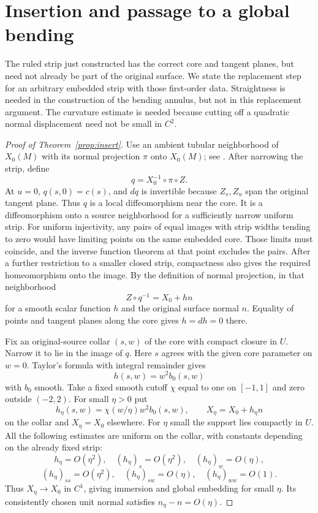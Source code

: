 \documentclass[11pt]{amsart}
\theoremstyle{definition}
\begin{document}
\section{Insertion and passage to a global bending}
\label{sec:insertion}

The ruled strip just constructed has the correct core and tangent
planes, but need not already be part of the original surface.
We state the replacement step for an arbitrary embedded strip
with those first-order data. Straightness is needed in the
construction of the bending annulus, but not in this replacement
argument. The curvature estimate is needed because cutting off
a quadratic normal displacement need not be small in $C^2$.

\begin{proof}[Proof of Theorem~\ref{prop:insert}]
Use an ambient tubular neighborhood of $X_0(M)$ with its normal
projection $\pi$ onto $X_0(M)$; see
\cite[Theorem~6.24]{Lee}. After narrowing the strip, define
\[
 q=X_0^{-1}\circ\pi\circ Z .
\]
At $u=0$, $q(s,0)=c(s)$, and $dq$ is invertible because
$Z_s,Z_u$ span the original tangent plane.
Thus $q$ is a local diffeomorphism near the core. It is a
diffeomorphism onto a source neighborhood for a sufficiently
narrow uniform strip. For uniform injectivity, any pairs of equal images with strip
widths tending to zero would have limiting points on the same
embedded core. Those limits must coincide, and the inverse
function theorem at that point excludes the pairs.
After a further restriction to a smaller closed strip, compactness
also gives the required homeomorphism onto the image.
By the definition of normal projection, in that neighborhood
\[
 Z\circ q^{-1}=X_0+hn
\]
for a smooth scalar function $h$ and the original surface normal
$n$. Equality of points and tangent planes along the core gives
$h=dh=0$ there.

Fix an original-source collar $(s,w)$ of the core with compact
closure in $U$. Narrow it to lie in the image of $q$. Here $s$
agrees with the given core parameter on $w=0$.
Taylor's formula with integral remainder gives
\[
 h(s,w)=w^2b_0(s,w)
\]
with $b_0$ smooth. Take a fixed smooth cutoff $\chi$ equal to one
on $[-1,1]$ and zero outside $(-2,2)$. For small $\eta>0$ put
\[
 h_\eta(s,w)=\chi(w/\eta)w^2b_0(s,w),\qquad
 X_\eta=X_0+h_\eta n
\]
on the collar and $X_\eta=X_0$ elsewhere.
For $\eta$ small the support lies compactly in $U$.
All the following estimates are uniform on the collar, with constants
depending on the already fixed strip:
\[
 h_\eta=O(\eta^2),\quad
 (h_\eta)_s=O(\eta^2),\quad(h_\eta)_w=O(\eta),
\]
\[
 (h_\eta)_{ss}=O(\eta^2),\quad
 (h_\eta)_{sw}=O(\eta),\quad(h_\eta)_{ww}=O(1).
\]
Thus $X_\eta\to X_0$ in $C^1$, giving immersion and global
embedding for small $\eta$. Its consistently chosen unit normal
satisfies $n_\eta-n=O(\eta)$.


\end{proof}
\end{document}
